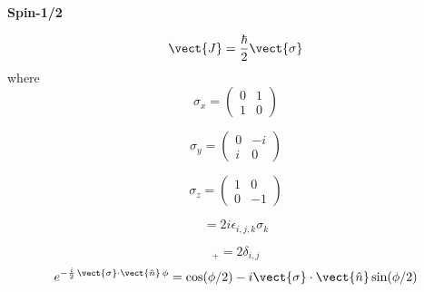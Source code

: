 {\bf Spin-1/2}

\begin{equation}
\vect{J} = \frac{\hbar}{2} \vect{\sigma}
\end{equation}
where
\begin{equation}
\sigma_x = \left(
           \begin{array}{cc}
              0 & 1 \\
              1 & 0
           \end{array}
           \right)
\end{equation}

\begin{equation}
\sigma_y = \left(
           \begin{array}{cc}
              0 & -i \\
              i & 0
           \end{array}
           \right)
\end{equation}

\begin{equation}
\sigma_z = \left(
           \begin{array}{cc}
              1 & 0 \\
              0 & -1
           \end{array}
           \right)
\end{equation}

\begin{equation}
[ \sigma_i, \sigma_j ] = 2i \epsilon_{i,j,k} \sigma_k
\end{equation}

\begin{equation}
[\,\sigma_i,\sigma_j\,]_+ = 2 \delta_{i,j}
\end{equation}
\begin{equation}
e^{- \frac{i}{2} \, \vect{\sigma} \cdot \vect{\hat{n}} \, \phi
     }
  = \cos(\phi /2) - i \vect{\sigma} \cdot \vect{\hat{n}} \sin(\phi /2)
\end{equation}
